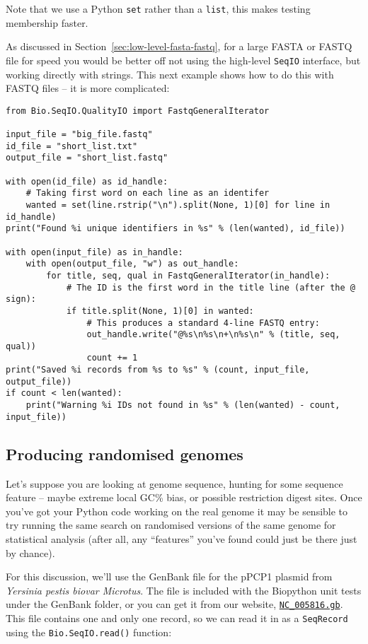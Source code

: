 Note that we use a Python \verb|set| rather than a \verb|list|, this makes
testing membership faster.

As discussed in Section~\ref{sec:low-level-fasta-fastq}, for a large FASTA
or FASTQ file for speed you would be better off not using the high-level
\verb|SeqIO| interface, but working directly with strings. This next
example shows how to do this with FASTQ files -- it is more complicated:

\begin{verbatim}
from Bio.SeqIO.QualityIO import FastqGeneralIterator

input_file = "big_file.fastq"
id_file = "short_list.txt"
output_file = "short_list.fastq"

with open(id_file) as id_handle:
    # Taking first word on each line as an identifer
    wanted = set(line.rstrip("\n").split(None, 1)[0] for line in id_handle)
print("Found %i unique identifiers in %s" % (len(wanted), id_file))

with open(input_file) as in_handle:
    with open(output_file, "w") as out_handle:
        for title, seq, qual in FastqGeneralIterator(in_handle):
            # The ID is the first word in the title line (after the @ sign):
            if title.split(None, 1)[0] in wanted:
                # This produces a standard 4-line FASTQ entry:
                out_handle.write("@%s\n%s\n+\n%s\n" % (title, seq, qual))
                count += 1
print("Saved %i records from %s to %s" % (count, input_file, output_file))
if count < len(wanted):
    print("Warning %i IDs not found in %s" % (len(wanted) - count, input_file))
\end{verbatim}

\subsection{Producing randomised genomes}

Let's suppose you are looking at genome sequence, hunting for some sequence
feature -- maybe extreme local GC\% bias, or possible restriction digest sites.
Once you've got your Python code working on the real genome it may be sensible
to try running the same search on randomised versions of the same genome for
statistical analysis (after all, any ``features'' you've found could just be
there just by chance).

For this discussion, we'll use the GenBank file for the pPCP1 plasmid from
\textit{Yersinia pestis biovar Microtus}.  The file is included with the
Biopython unit tests under the GenBank folder, or you can get it from our
website, \href{https://raw.githubusercontent.com/biopython/biopython/master/Tests/GenBank/NC_005816.gb}
{\texttt{NC\_005816.gb}}.
This file contains one and only one record, so we can read it in as a
\verb|SeqRecord| using the \verb|Bio.SeqIO.read()| function:

